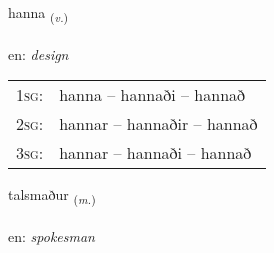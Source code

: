 \documentclass[frontgrid, backgrid]{flacards}\usepackage[]{graphicx}\usepackage[]{color}
\begin{document}
\renewcommand{\flhead}{\vskip5pt \fboxsep=0pt {\small\bfseries\footnotesize Sagnorð | Verb}}
\renewcommand{\fcfoot}{\vskip5pt \fboxsep=0pt \hspace{2pt}{\small\bfseries\footnotesize 2K}}

\renewcommand{\blhead}{\vskip5pt {\small\bfseries\footnotesize Sagnorð | Verb }}
\renewcommand{\bcfoot}{\vskip5pt \hspace{2pt}{\small\bfseries\footnotesize 2K}}


{hanna \small{\textsubscript{(\textit{v.})}} \\[1ex] %
\textphonetic{[hana]} \\
en: \emph{design} \\  [2ex]
\renewcommand*{\arraystretch}{0.8}
\begin{tabular}{p{1cm}l}
\textsc{1sg}: & hanna -- hannaði -- hannað \\ 
\textsc{2sg}: & hannar -- hannaðir -- hannað \\ 
\textsc{3sg}: & hannar -- hannaði -- hannað \\ 
\end{tabular}
}

\renewcommand{\flhead}{\vskip5pt \fboxsep=0pt {\small\bfseries\footnotesize Nafnorð | Noun}}
\renewcommand{\fcfoot}{\vskip5pt \fboxsep=0pt \hspace{2pt}{\small\bfseries\footnotesize 2K}}

\renewcommand{\blhead}{\vskip5pt {\small\bfseries\footnotesize Nafnorð | Noun }}
\renewcommand{\bcfoot}{\vskip5pt \hspace{2pt}{\small\bfseries\footnotesize 2K}}


{talsmaður \small{\textsubscript{(\textit{m.})}} \\[1ex] %
\textphonetic{[tʰalsmaðʏr]} \\
en: \emph{spokesman} \\  [2ex]
\renewcommand*{\arraystretch}{0.8}
}
\end{document}
